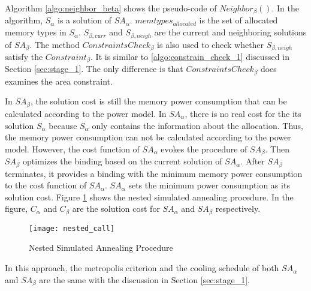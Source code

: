 	Algorithm \ref{algo:neighbor_beta} shows the
	pseudo-code of $Neighbor_{\beta}()$. In the algorithm, $S_{\alpha}$ is a solution of
	$SA_{\alpha}$. $memtypes_{allocated}$ is the set of allocated memory types in $S_{\alpha}$.
	$S_{\beta,curr}$ and $S_{\beta,neigh}$ are the current and neighboring solutions
	of $SA_{\beta}$. The method $ConstraintsCheck_{\beta}$ is also used to check whether
	$S_{\beta,neigh}$ satisfy the $Constraint_{\beta}$. It is similar to \ref{algo:constrain_check_1}
	discussed in Section \ref{sec:stage_1}. The only difference is that $ConstraintsCheck_{\beta}$
	does examines the area constraint.
	
	
	In $SA_{\beta}$, the solution cost is still the memory power consumption that can be calculated
	according to the power model.
	In $SA_{\alpha}$, there is no real cost for the its solution $S_{\alpha}$ because $S_{\alpha}$
	only contains the information about the allocation. Thus, the memory power consumption can not
	be calculated according to the power model. However, the cost function of $SA_{\alpha}$ evokes
	the procedure of $SA_{\beta}$. Then $SA_{\beta}$ optimizes the binding based on the current 
	solution of $SA_{\alpha}$. After $SA_{\beta}$ terminates, it provides a binding with the
	minimum memory power consumption to the cost function of $SA_{\alpha}$. $SA_{\alpha}$ sets
	the minimum power consumption as its solution cost. Figure \ref{fig:nested_call} shows the
	nested simulated annealing procedure. In the figure, $C_{\alpha}$ and $C_{\beta}$ are the
	solution cost for $SA_{\alpha}$ and $SA_{\beta}$ respectively.
	\begin{figure}[h]
		\begin{center}
			\texttt{[image: nested\_call]}
			\caption{Nested Simulated Annealing Procedure}
			\label{fig:nested_call}
		\end{center}
	\end{figure}

	In this approach, the metropolis criterion and the cooling schedule of both $SA_{\alpha}$
	and $SA_{\beta}$ are the same with the discussion in Section \ref{sec:stage_1}.
	

